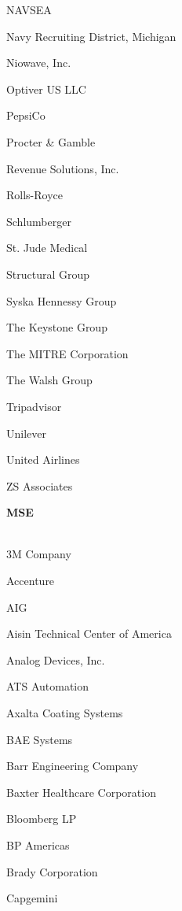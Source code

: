 \documentclass[twoside]{article}
\begin{document}
\begin{center}
\begin{multicols}{5}
\begin{FlushLeft}
\begin{compactitem}
\item NAVSEA
\item Navy Recruiting District, Michigan
\item Niowave, Inc.
\item Optiver US LLC
\item PepsiCo
\item Procter \& Gamble
\item Revenue Solutions, Inc.
\item Rolls-Royce
\item Schlumberger
\item St. Jude Medical
\item Structural Group
\item Syska Hennessy Group
\item The Keystone Group
\item The MITRE Corporation
\item The Walsh Group
\item Tripadvisor
\item Unilever
\item United Airlines
\item ZS Associates
\end{compactitem}
        \end{FlushLeft}
        \vspace{1em}
        {\fontsize{14}{16}\selectfont \bf MSE}\\
        \vspace{-1em}
        ~\hrulefill~
        \vspace{-.9em}
        \begin{FlushLeft}
        \begin{compactitem}
        \item 3M Company
\item Accenture
\item AIG
\item Aisin Technical Center of America
\item Analog Devices, Inc.
\item ATS Automation
\item Axalta Coating Systems
\item BAE Systems
\item Barr Engineering Company
\item Baxter Healthcare Corporation
\item Bloomberg LP
\item BP Americas
\item Brady Corporation
\item Capgemini

\end{compactitem}
\end{FlushLeft}
\end{multicols}
\end{center}
\end{document}
